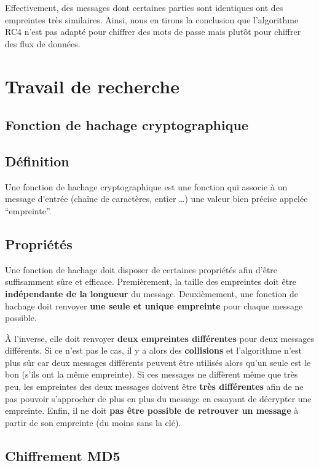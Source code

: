 \documentclass[12pt, a4paper]{article}
\begin{document}
\noindent Effectivement, des messages dont certaines parties sont identiques ont des empreintes très similaires.
Ainsi, nous en tirons la conclusion que l'algorithme RC4 n'est pas adapté pour chiffrer des mots de passe
mais plutôt pour chiffrer des flux de données.

\section{Travail de recherche}

\subsection{Fonction de hachage cryptographique}

\subsection*{Définition}
Une fonction de hachage cryptographique est une fonction qui associe à un message d'entrée
(chaîne de caractères, entier …) une valeur bien précise appelée “empreinte”.

\subsection*{Propriétés}\label{hash_properties}

Une fonction de hachage doit disposer de certaines propriétés afin d'être suffisamment sûre et efficace.
Premièrement, la taille des empreintes doit être \textbf{indépendante de la longueur} du message.
Deuxièmement, une fonction de hachage doit renvoyer \textbf{une seule et unique empreinte} pour chaque message possible.

À l'inverse, elle doit renvoyer \textbf{deux empreintes différentes} pour deux messages différents.
Si ce n'est pas le cas, il y a alors des \textbf{collisions} et l'algorithme n'est plus sûr
car deux messages différents peuvent être utilisés alors qu'un seule est le bon (s'ils ont la même empreinte).
Si ces messages ne diffèrent même que très peu, les empreintes des deux messages doivent être \textbf{très différentes}
 afin de ne pas pouvoir s'approcher de plus en plus du message en essayant de décrypter une empreinte.
Enfin, il ne doit \textbf{pas être possible de retrouver un message} à partir de son empreinte (du moins sans la clé).

\subsection{Chiffrement MD5}
\end{document}

